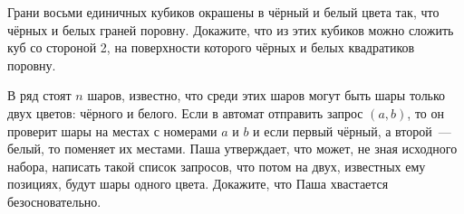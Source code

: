 \begin{problems}
\item Грани восьми единичных кубиков окрашены в чёрный и белый цвета так, что чёрных и белых граней поровну. Докажите, что из этих кубиков можно сложить куб со стороной 2, на поверхности которого чёрных и белых квадратиков поровну.

\item В ряд стоят $n$ шаров, известно, что среди этих шаров могут быть шары только двух цветов: чёрного и белого. Если в автомат отправить запрос $(a, b)$, то он проверит шары на местах с номерами $a$ и $b$ и если первый чёрный, а второй~--- белый, то поменяет их местами. Паша утверждает, что может, не зная исходного набора, написать такой список запросов, что потом на двух, известных ему позициях, будут шары одного цвета. Докажите, что Паша хвастается безосновательно.  


\end{problems}
